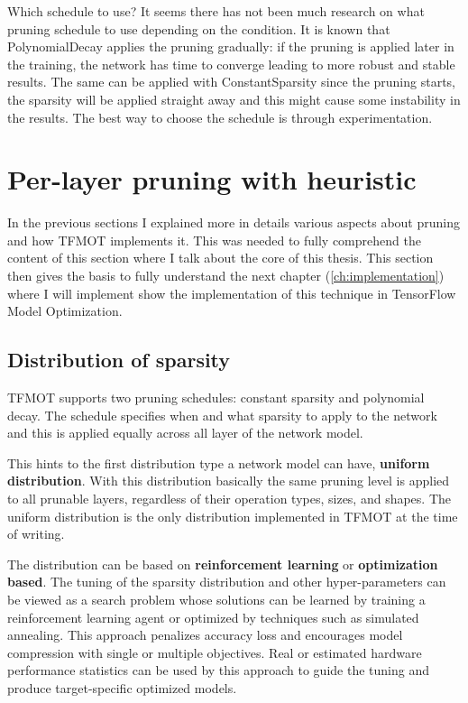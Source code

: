 Which schedule to use? It seems there has not been much research on what
pruning schedule to use depending on the condition.
It is known that PolynomialDecay applies the pruning gradually: if the pruning
is applied later in the training, the network has time to converge leading to
more robust and stable results.
The same can be applied with ConstantSparsity since the pruning starts, the
sparsity will be applied straight away and this might cause some instability in
the results.
The best way to choose the schedule is through experimentation.

\section{Per-layer pruning with heuristic}\label{sec:heuristic}
In the previous sections I explained more in details various aspects about
pruning and how TFMOT implements it. This was needed to fully comprehend the
content of this section where I talk about the core of this thesis.
This section then gives the basis to fully understand the next chapter
(\autoref{ch:implementation}) where I will implement show the implementation
of this technique in TensorFlow Model Optimization.

\subsection{Distribution of sparsity}
TFMOT supports two pruning schedules: constant sparsity and polynomial decay.
The schedule specifies when and what sparsity to apply to the network and this
is applied equally across all layer of the network model.

This hints to the first distribution type a network model can have,
\textbf{uniform distribution}. With this distribution basically the same
pruning level is applied to all prunable layers, regardless of their operation
types, sizes, and shapes.
The uniform distribution is the only distribution implemented in TFMOT at the
time of writing.

The distribution can be based on \textbf{reinforcement learning} or
\textbf{optimization based}. The tuning of the sparsity distribution and other
hyper-parameters can be viewed as a search problem whose solutions can be
learned\cite{He_2018} by training a reinforcement learning agent or optimized
by techniques such as simulated annealing. This approach penalizes accuracy
loss and encourages model compression with single or multiple objectives.
Real or estimated hardware performance statistics can be used by this approach
to guide the tuning and produce target-specific optimized models.

